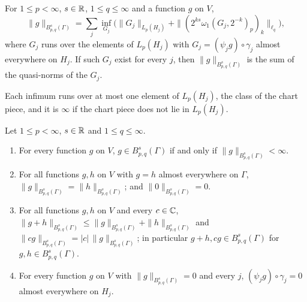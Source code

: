 \begin{definition}
\label{def:boundary-besov-norm}
\leanok
{}
For $1 \leq p < \infty$, $s \in \mathbb{R}$, $1 \leq q \leq \infty$ and a function $g$ on $V$,
\[
  \|g\|_{B^s_{p,q}(\Gamma)} = \sum_j \inf_{G_j}
    \bigl(\|G_j\|_{L_p(H_j)} + \|(2^{ks} \omega_1(G_j, 2^{-k})_p)_k\|_{\ell_q}\bigr),
\]
where $G_j$ runs over the elements of $L_p(H_j)$ with $G_j = (\psi_j g) \circ \gamma_j$ almost
everywhere on $H_j$. If such $G_j$ exist for every $j$, then
$\|g\|_{B^s_{p,q}(\Gamma)}$ is the sum of the quasi-norms of the $G_j$.
\end{definition}

Each infimum runs over at most one element of $L_p(H_j)$, the class of the chart piece, and it
is $\infty$ if the chart piece does not lie in $L_p(H_j)$.

\begin{lemma}
\label{lem:boundary-besov-norm-properties}
\leanok
{}
Let $1 \leq p < \infty$, $s \in \mathbb{R}$ and $1 \leq q \leq \infty$.
\begin{enumerate}
  \item For every function $g$ on $V$, $g \in B^s_{p,q}(\Gamma)$ if and only if
    $\|g\|_{B^s_{p,q}(\Gamma)} < \infty$.
  \item For all functions $g, h$ on $V$ with $g = h$ almost everywhere on $\Gamma$,
    $\|g\|_{B^s_{p,q}(\Gamma)} = \|h\|_{B^s_{p,q}(\Gamma)}$; and $\|0\|_{B^s_{p,q}(\Gamma)} = 0$.
  \item For all functions $g, h$ on $V$ and every $c \in \mathbb{C}$,
    $\|g + h\|_{B^s_{p,q}(\Gamma)} \leq \|g\|_{B^s_{p,q}(\Gamma)} + \|h\|_{B^s_{p,q}(\Gamma)}$
    and $\|c g\|_{B^s_{p,q}(\Gamma)} = |c| \, \|g\|_{B^s_{p,q}(\Gamma)}$; in particular
    $g + h, c g \in B^s_{p,q}(\Gamma)$ for $g, h \in B^s_{p,q}(\Gamma)$.
  \item For every function $g$ on $V$ with $\|g\|_{B^s_{p,q}(\Gamma)} = 0$ and every $j$,
    $(\psi_j g) \circ \gamma_j = 0$ almost everywhere on $H_j$.
\end{enumerate}
\end{lemma}

